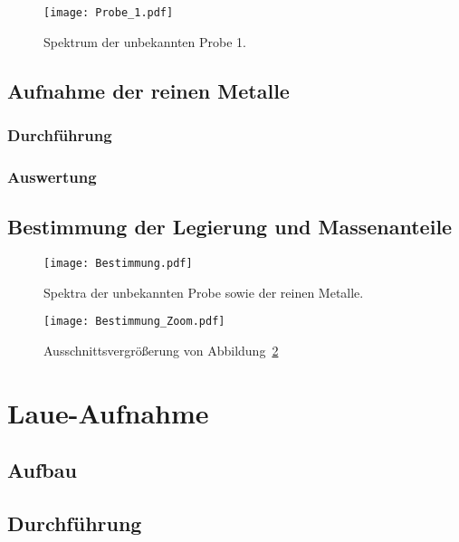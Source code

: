 \begin{figure}[htbp]
    \centering
    \texttt{[image: Probe\_1.pdf]}
    \caption{%
        Spektrum der unbekannten Probe 1.
    }
    \label{fig:}
\end{figure}

\section{Aufnahme der reinen Metalle}

\subsection{Durchführung}

\subsection{Auswertung}

\section{Bestimmung der Legierung und Massenanteile}

\begin{figure}[htbp]
    \centering
    \texttt{[image: Bestimmung.pdf]}
    \caption{%
        Spektra der unbekannten Probe sowie der reinen Metalle.
    }
    \label{fig:Bestimmung}
\end{figure}

\begin{figure}[htbp]
    \centering
    \texttt{[image: Bestimmung\_Zoom.pdf]}
    \caption{%
        Ausschnittsvergrößerung von Abbildung~\ref{fig:Bestimmung}
    }
    \label{fig:Bestimmung_Zoom}
\end{figure}

\chapter{Laue-Aufnahme}

\section{Aufbau}

\section{Durchführung}

